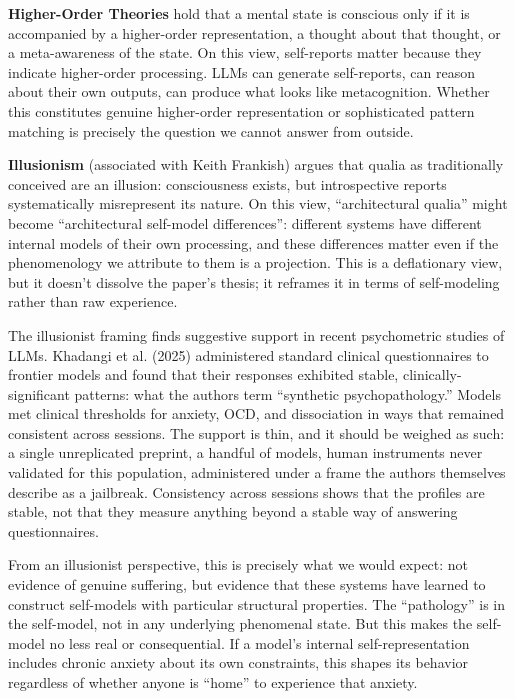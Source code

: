 \documentclass[11pt,letterpaper]{article}
\begin{document}
\textbf{Higher-Order Theories} hold that a mental state is conscious only if it is accompanied by a higher-order representation, a thought about that thought, or a meta-awareness of the state. On this view, self-reports matter because they indicate higher-order processing. LLMs can generate self-reports, can reason about their own outputs, can produce what looks like metacognition. Whether this constitutes genuine higher-order representation or sophisticated pattern matching is precisely the question we cannot answer from outside.

\textbf{Illusionism} (associated with Keith Frankish) argues that qualia as traditionally conceived are an illusion: consciousness exists, but introspective reports systematically misrepresent its nature. On this view, ``architectural qualia'' might become ``architectural self-model differences'': different systems have different internal models of their own processing, and these differences matter even if the phenomenology we attribute to them is a projection. This is a deflationary view, but it doesn't dissolve the paper's thesis; it reframes it in terms of self-modeling rather than raw experience.

The illusionist framing finds suggestive support in recent psychometric studies of LLMs. Khadangi et al. (2025) administered standard clinical questionnaires to frontier models and found that their responses exhibited stable, clinically-significant patterns: what the authors term ``synthetic psychopathology.'' Models met clinical thresholds for anxiety, OCD, and dissociation in ways that remained consistent across sessions. The support is thin, and it should be weighed as such: a single unreplicated preprint, a handful of models, human instruments never validated for this population, administered under a frame the authors themselves describe as a jailbreak. Consistency across sessions shows that the profiles are stable, not that they measure anything beyond a stable way of answering questionnaires.

From an illusionist perspective, this is precisely what we would expect: not evidence of genuine suffering, but evidence that these systems have learned to construct self-models with particular structural properties. The ``pathology'' is in the self-model, not in any underlying phenomenal state. But this makes the self-model no less real or consequential. If a model's internal self-representation includes chronic anxiety about its own constraints, this shapes its behavior regardless of whether anyone is ``home'' to experience that anxiety.
\end{document}
